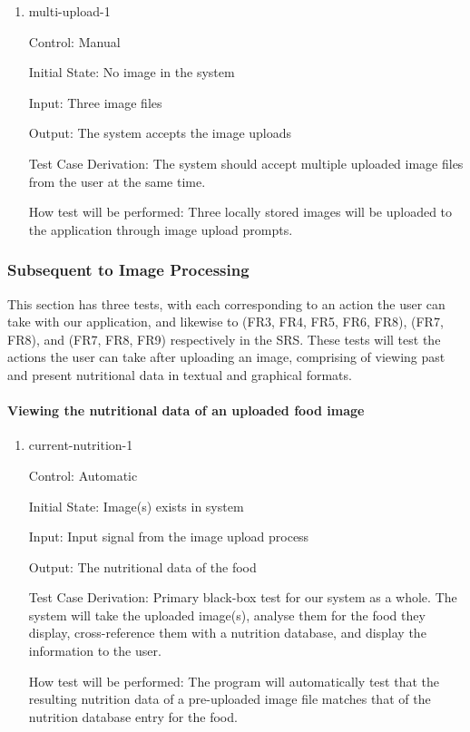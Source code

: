 \documentclass[12pt, titlepage]{article}
\begin{document}
	\begin{enumerate}
		
		\item{multi-upload-1\\}
		
		Control: Manual
		
		Initial State: No image in the system
		
		Input: Three image files
		
		Output: The system accepts the image uploads
		
		Test Case Derivation: The system should accept multiple uploaded image files from the user at the same time.
		
		How test will be performed: Three locally stored images will be uploaded to the application through image upload prompts. 
		
	\end{enumerate}
	
	\subsubsection{Subsequent to Image Processing}
	This section has three tests, with each corresponding to an action the user can take with our application, and likewise to (FR3, FR4, FR5, FR6, FR8), (FR7, FR8), and (FR7, FR8, FR9) respectively in the SRS. These tests will test the actions the user can take after uploading an image, comprising of viewing past and present nutritional data in textual and graphical formats.
	
	\paragraph{Viewing the nutritional data of an uploaded food image}
	
	\begin{enumerate}
		
		\item{current-nutrition-1\\}
		
		Control: Automatic
		
		Initial State: Image(s) exists in system
		
		Input: Input signal from the image upload process
		
		Output: The nutritional data of the food
		
		Test Case Derivation: Primary black-box test for our system as a whole. The system will take the uploaded image(s), analyse them for the food they display, cross-reference them with a nutrition database, and display the information to the user.
		
		How test will be performed: The program will automatically test that the resulting nutrition data of a pre-uploaded image file matches that of the nutrition database entry for the food.
		
	\end{enumerate}
	
\end{document}
